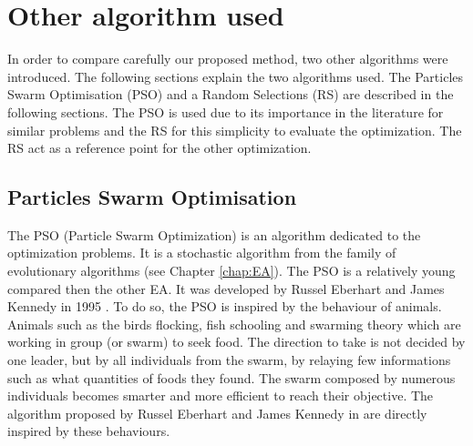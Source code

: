 
\section{Other algorithm used}

In order to compare carefully our proposed method, two other algorithms were introduced. The following sections explain the two algorithms used. %
The Particles Swarm Optimisation (PSO) and a Random Selections (RS) are described in the following sections. The PSO is used due to its importance in the literature for similar problems and the RS for this simplicity to evaluate the optimization. The RS  act as a reference point for the other optimization.  

\subsection{Particles Swarm Optimisation } \label{sec:PSOdetail}

The PSO (Particle Swarm Optimization) is an algorithm dedicated to the optimization problems. It is a stochastic algorithm from the family of evolutionary algorithms (see Chapter \ref{chap:EA}). 
The PSO is a relatively young compared then the other EA. It was developed by Russel Eberhart and James Kennedy in 1995 \cite{148*eberhart1995}.%
To do so, the PSO is inspired by the behaviour of animals.%
Animals such as the birds flocking, fish schooling and swarming theory which are working in group (or swarm) to seek food. 
The direction to take is not decided by one leader, but by all individuals from the swarm, by relaying few informations such as what quantities of foods they found. 
The swarm composed by numerous individuals becomes smarter and more efficient to reach their objective. 
The algorithm proposed by Russel Eberhart and James Kennedy in  \cite{148*eberhart1995} are directly inspired by these behaviours.

